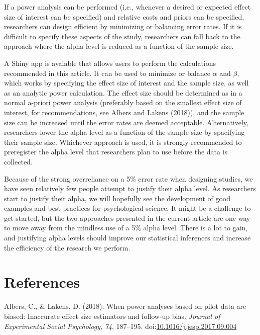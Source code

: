 \documentclass[,jou,floatsintext]{apa6}
\begin{document}
If a power analysis can be performed (i.e., whenever a desired or expected effect size of interest can be specified) and relative costs and priors can be specified, researchers can design efficient by minimizing or balancing error rates. If it is difficult to specify these aspects of the study, researchers can fall back to the approach where the alpha level is reduced as a function of the sample size.

A Shiny app is avaiable that allows users to perform the calculations recommended in this article. It can be used to minimize or balance \(\alpha\) and \(\beta\), which works by specifying the effect size of interest and the sample size, as well as an analytic power calculation. The effect size should be determined as in a normal a-priori power analysis (preferably based on the smallest effect size of interest, for recommendations, see Albers and Lakens (2018)), and the sample size can be increased until the error rates are deemed acceptable. Alternatively, researchers lower the alpha level as a function of the sample size by spacifying their sample size. Whichever approach is used, it is strongly recommended to preregister the alpha level that researchers plan to use before the data is collected.

Because of the strong overreliance on a 5\% error rate when designing studies, we have seen relatively few people attempt to justify their alpha level. As researchers start to justify their alpha, we will hopefully see the development of good examples and best practices for psychological science. It might be a challenge to get started, but the two approaches presented in the current article are one way to move away from the mindless use of a 5\% alpha level. There is a lot to gain, and justifying alpha levels should improve our statistical inferences and increase the efficiency of the research we perform.

\hypertarget{references}{%
\section{References}\label{references}}

\setlength{\parindent}{-0.5in}
\setlength{\leftskip}{0.5in}

\hypertarget{refs}{}
\leavevmode\hypertarget{ref-albers_when_2018}{}%
Albers, C., \& Lakens, D. (2018). When power analyses based on pilot data are biased: Inaccurate effect size estimators and follow-up bias. \emph{Journal of Experimental Social Psychology}, \emph{74}, 187--195. doi:\href{https://doi.org/10.1016/j.jesp.2017.09.004}{10.1016/j.jesp.2017.09.004}
\end{document}
